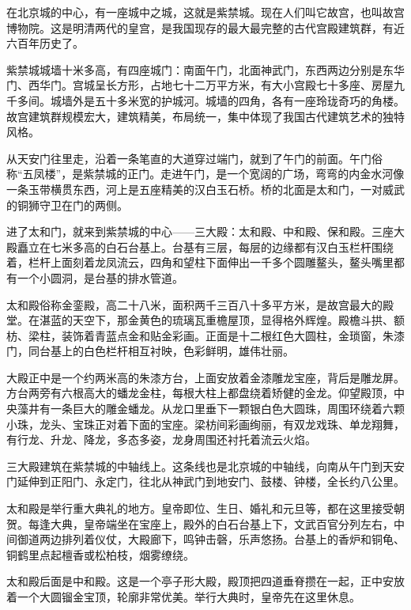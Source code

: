 \documentclass[12pt,UTF-8,openany]{ctexbook}
\begin{document}
\begin{Large}
    
    在北京城的中心，有一座城中之城，这就是紫禁城。现在人们叫它故宫，也叫故宫博物院。这是明清两代的皇宫，是我国现存的最大最完整的古代宫殿建筑群，有近六百年历史了。
    
    紫禁城城墙十米多高，有四座城门：南面午门，北面神武门，东西两边分别是东华门、西华门。宫城呈长方形，占地七十二万平方米，有大小宫殿七十多座、房屋九千多间。城墙外是五十多米宽的护城河。城墙的四角，各有一座玲珑奇巧的角楼。故宫建筑群规模宏大，建筑精美，布局统一，集中体现了我国古代建筑艺术的独特风格。
    
    从天安门往里走，沿着一条笔直的大道穿过端门，就到了午门的前面。午门俗称“五凤楼”，是紫禁城的正门。走进午门，是一个宽阔的广场，弯弯的内金水河像一条玉带横贯东西，河上是五座精美的汉白玉石桥。桥的北面是太和门，一对威武的铜狮守卫在门的两侧。
    
    进了太和门，就来到紫禁城的中心——三大殿：太和殿、中和殿、保和殿。三座大殿矗立在七米多高的白石台基上。台基有三层，每层的边缘都有汉白玉栏杆围绕着，栏杆上面刻着龙凤流云，四角和望柱下面伸出一千多个圆雕鳌头，鳌头嘴里都有一个小圆洞，是台基的排水管道。
    
    太和殿俗称金銮殿，高二十八米，面积两千三百八十多平方米，是故宫最大的殿堂。在湛蓝的天空下，那金黄色的琉璃瓦重檐屋顶，显得格外辉煌。殿檐斗拱、额枋、梁柱，装饰着青蓝点金和贴金彩画。正面是十二根红色大圆柱，金琐窗，朱漆门，同台基上的白色栏杆相互衬映，色彩鲜明，雄伟壮丽。
    
    大殿正中是一个约两米高的朱漆方台，上面安放着金漆雕龙宝座，背后是雕龙屏。方台两旁有六根高大的蟠龙金柱，每根大柱上都盘绕着矫健的金龙。仰望殿顶，中央藻井有一条巨大的雕金蟠龙。从龙口里垂下一颗银白色大圆珠，周围环绕着六颗小珠，龙头、宝珠正对着下面的宝座。梁枋间彩画绚丽，有双龙戏珠、单龙翔舞，有行龙、升龙、降龙，多态多姿，龙身周围还衬托着流云火焰。
    
    三大殿建筑在紫禁城的中轴线上。这条线也是北京城的中轴线，向南从午门到天安门延伸到正阳门、永定门，往北从神武门到地安门、鼓楼、钟楼，全长约八公里。
    
    太和殿是举行重大典礼的地方。皇帝即位、生日、婚礼和元旦等，都在这里接受朝贺。每逢大典，皇帝端坐在宝座上，殿外的白石台基上下，文武百官分列左右，中间御道两边排列着仪仗，大殿廊下，鸣钟击磬，乐声悠扬。台基上的香炉和铜龟、铜鹤里点起檀香或松柏枝，烟雾缭绕。
    
    太和殿后面是中和殿。这是一个亭子形大殿，殿顶把四道垂脊攒在一起，正中安放着一个大圆镏金宝顶，轮廓非常优美。举行大典时，皇帝先在这里休息。
    

\end{Large}
\end{document}
